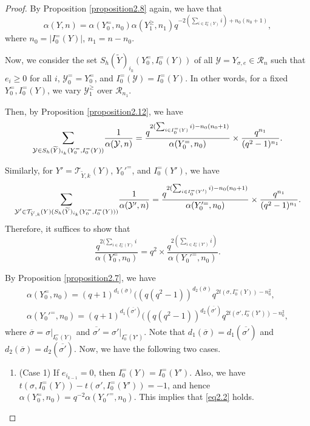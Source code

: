 \documentclass[11pt,oneside]{amsart}
\theoremstyle{plain}
\theoremstyle{definition}
\theoremstyle{remark}
\newcommand{\CR}{{\mathcal R}}
\newcommand{\CT}{{\mathcal T}}
\newcommand{\CY}{{\mathcal Y}}
\numberwithin{equation}{section}
\begin{document}
\begin{proof}
		By Proposition \ref{proposition2.8} again, we have that
		\begin{equation*}
			\alpha(Y,n)=\alpha(Y_0^{=},n_0)\alpha(Y_1^{\geq},n_1)q^{-2(\sum_{i \in I_0^{=}(Y)} i)+n_0(n_0+1)},
		\end{equation*}
		where $n_0=\vert I_0^=(Y) \vert$, $n_1=n-n_0$.
		
		Now, we consider the set $S_h(\widetilde{Y})_{i_k}(Y_0^=,I_0^=(Y))$ of all $\CY=Y_{\sigma,e} \in \CR_n$ such that $e_i \geq 0$ for all $i$, $\CY_0^==Y_0^{=}$, and $I_0^=(\CY)=I_0^=(Y)$. In other words, for a fixed $Y_0^=, I_0^=(Y)$, we vary $\CY_1^{\geq}$ over $\CR_{n_1}$.
		
		Then, by Proposition \ref{proposition2.12}, we have
		\begin{equation*}
			\mathlarger{\sum}_{\CY \in S_h(\widetilde{Y})_{i_k}(Y_0^=,I_0^=(Y))} \dfrac{1}{\alpha(\CY,n)}=\dfrac{q^{2(\sum_{i \in I_0^{=}(Y)} i)-n_0(n_0+1)}}{\alpha(Y_0^=,n_0)}\times \dfrac{q^{n_1}}{(q^2-1)^{n_1}}.
		\end{equation*}
		
		Similarly, for $Y'=\CT_{\widetilde{Y},k}(Y)$, $Y_0'^{=}$, and $I_0^{=}(Y')$, we have
		\begin{equation*}
			\mathlarger{\sum}_{\CY' \in \CT_{\widetilde{Y},k}(Y)( S_h(\widetilde{Y})_{i_k}(Y_0^=,I_0^=(Y)))} \dfrac{1}{\alpha(\CY',n)}=\dfrac{q^{2(\sum_{i \in I_0^{=}(Y')} i)-n_0(n_0+1)}}{\alpha(Y_0'^=,n_0)}\times \dfrac{q^{n_1}}{(q^2-1)^{n_1}}.
		\end{equation*}
		Therefore, it suffices to show that
		\begin{equation}\label{eq2.2}
			\dfrac{q^{2(\sum_{i \in I_0^{=}(Y)} i}}{\alpha(Y_0^=,n_0)}=q^2 \times \dfrac{q^{2(\sum_{i \in I_0^{=}(Y')} i)}}{\alpha(Y_0'^=,n_0)}.
		\end{equation}
		
		By Proposition \ref{proposition2.7}, we have
		\begin{equation*}
			\begin{array}{l}
				\alpha(Y_0^=,n_0)=(q+1)^{d_1(\overline{\sigma})}((q(q^2-1))^{d_2(\overline{\sigma})}q^{2t(\sigma,I_0^{=}(Y))-n_0^2},\\
				\alpha(Y_0'^=,n_0)=(q+1)^{d_1(\overline{\sigma'})}((q(q^2-1))^{d_2(\overline{\sigma'})}q^{2t(\sigma',I_0^{=}(Y'))-n_0^2},
			\end{array}
		\end{equation*}
		where $\overline{\sigma}=\sigma\vert_{I_0^{=}(Y)}$ and  $\overline{\sigma'}=\sigma'\vert_{I_0^{=}(Y')}$. Note that $d_1(\overline{\sigma})=d_1(\overline{\sigma'})$ and $d_2(\overline{\sigma})=d_2(\overline{\sigma'})$. Now, we have the following two cases.
		\begin{enumerate}
			\item (Case 1) If $e_{i_{k-1}}=0$, then $I_0^{=}(Y)=I_0^{=}(Y')$. Also, we have $t(\sigma,I_0^=(Y))-t(\sigma',I_0^=(Y'))=-1$, and hence $\alpha(Y_0^=,n_0)=q^{-2}\alpha(Y_0'^=,n_0)$. This implies that \eqref{eq2.2} holds.
			

\end{enumerate}
\end{proof}
\end{document}
